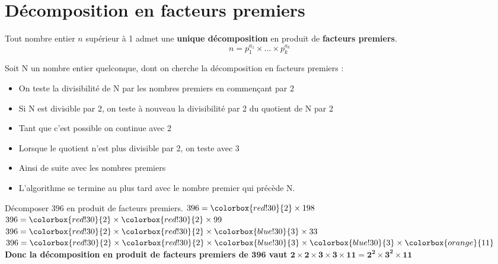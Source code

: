\section{Décomposition en facteurs premiers}

\begin{propriete}[\admise]
Tout nombre entier $n$ supérieur à 1 admet une \textbf{unique décomposition} en produit de \textbf{facteurs premiers}.
$$n=p_1^{a_1}\times...\times p_k^{a_k}$$
\end{propriete}

\begin{methode}
    Soit N un nombre entier quelconque, dont on cherche la décomposition en facteurs premiers :
    \begin{itemize}
        \item On teste la divisibilité de N par les nombres premiers en commençant par 2
        \item Si N est divisible par 2, on teste à nouveau la divisibilité par 2 du quotient de N par 2
        \item Tant que c'est possible on continue avec 2
        \item Lorsque le quotient n'est plus divisible par 2, on teste avec 3
        \item Ainsi de suite avec les nombres premiers 
        \item L'algorithme se termine au plus tard avec le nombre premier qui précède N.
    \end{itemize}
    \exercice
    Décomposer $396$ en produit de facteurs premiers.
    \correction
    $396 = \colorbox{red!30}{2} \times  198$\\
    $396 = \colorbox{red!30}{2} \times  \colorbox{red!30}{2} \times  99$\\
    $396 = \colorbox{red!30}{2} \times  \colorbox{red!30}{2} \times  \colorbox{blue!30}{3} \times  33$\\
    $396 = \colorbox{red!30}{2} \times  \colorbox{red!30}{2} \times  \colorbox{blue!30}{3} \times  \colorbox{blue!30}{3} \times  \colorbox{orange}{11}$\\
    {\bfseries Donc la décomposition en produit de facteurs premiers de $\mathbf{396}$ vaut $\mathbf{2 \times  2 \times  3 \times  3 \times  11 = 2^2\times 3^2\times 11}$}

\end{methode}

